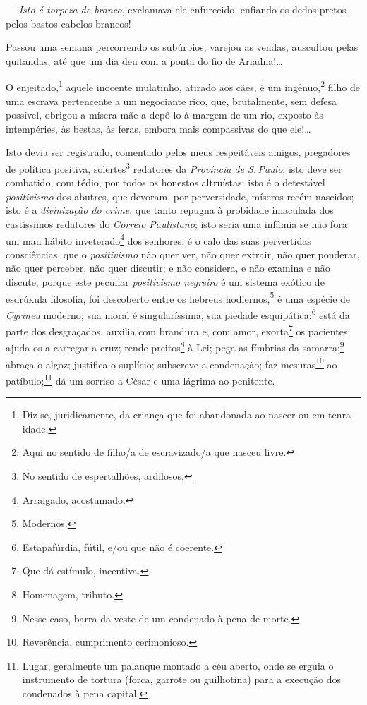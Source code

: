 {--- \emph{Isto é torpeza de branco}, exclamava ele enfurecido, enfiando
os dedos pretos pelos bastos cabelos brancos!

Passou uma semana percorrendo os subúrbios; varejou as vendas, auscultou
pelas quitandas, até que um dia deu com a ponta do fio de Ariadna!\ldots{}

O enjeitado,\footnote{Diz-se, juridicamente, da criança que foi
  abandonada ao nascer ou em tenra idade.} aquele inocente mulatinho,
atirado aos cães, é um ingênuo,\footnote{Aqui no sentido de filho/a de
  escravizado/a que nasceu livre.} filho de uma escrava pertencente a
um negociante rico, que, brutalmente, sem defesa possível, obrigou a
mísera mãe a depô-lo à margem de um rio, exposto às intempéries, às
bestas, às feras, embora mais compassivas do que ele!\ldots{}

Isto devia ser registrado, comentado pelos meus respeitáveis amigos,
pregadores de política positiva, solertes\footnote{No sentido de
  espertalhões, ardilosos.} redatores da \emph{Província de S.\,Paulo};
isto deve ser combatido, com tédio, por todos os honestos altruístas:
isto é o detestável \emph{positivismo} dos abutres, que devoram, por
perversidade, míseros recém-nascidos; isto é a \emph{divinização do
crime}, que tanto repugna à probidade imaculada dos castíssimos
redatores do \emph{Correio Paulistano}; isto seria uma infâmia se não
fora um mau hábito inveterado\footnote{Arraigado, acostumado.} dos
senhores; é o calo das suas pervertidas consciências, que o
\emph{positivismo} não quer ver, não quer extrair, não quer ponderar,
não quer perceber, não quer discutir; e não considera, e não examina e
não discute, porque este peculiar \emph{positivismo negreiro} é um
sistema exótico de esdrúxula filosofia, foi descoberto entre os hebreus
hodiernos,\footnote{Modernos.} é uma espécie de \emph{Cyrineu} 
moderno; sua moral é singularíssima, sua piedade esquipática:\footnote{
  Estapafúrdia, fútil, e/ou que não é coerente.} está da parte dos
desgraçados, auxilia com brandura e, com amor, exorta\footnote{Que dá
  estímulo, incentiva.} os pacientes; ajuda-os a carregar a cruz; rende
preitos\footnote{Homenagem, tributo.} à Lei; pega as fímbrias da
samarra;\footnote{Nesse caso, barra da veste de um condenado à pena de
  morte.} abraça o algoz; justifica o suplício; subscreve a condenação;
faz mesuras\footnote{Reverência, cumprimento cerimonioso.} ao
patíbulo;\footnote{Lugar, geralmente um palanque montado a céu aberto,
  onde se erguia o instrumento de tortura (forca, garrote ou guilhotina)
  para a execução dos condenados à pena capital.}
dá um sorriso a César e uma
lágrima ao penitente.

}
